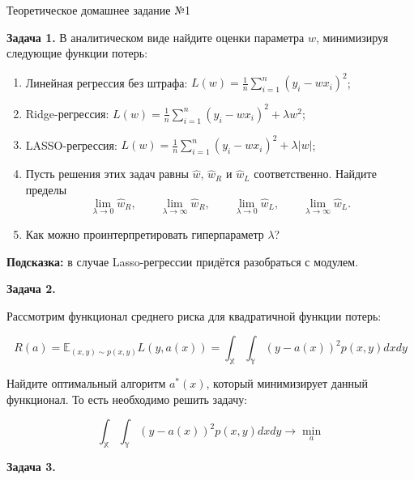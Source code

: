 \documentclass[12pt,a4paper]{article}
\begin{document}
\begin{center}
    {\Large Теоретическое домашнее задание №1}\\[8pt]
\end{center}

\vspace{2em}

\noindent
\textbf{Задача 1.} В аналитическом виде найдите оценки параметра $w$, минимизируя
следующие функции потерь:

\begin{enumerate}[itemsep=6pt, topsep=8pt]
    \item Линейная регрессия без штрафа:
          $L(w) = \frac{1}{n}\sum_{i=1}^{n}(y_i - wx_i)^2$;

    \item Ridge-регрессия:
          $L(w) = \frac{1}{n}\sum_{i=1}^{n}(y_i - wx_i)^2 + \lambda w^2$;

    \item LASSO-регрессия:
          $L(w) = \frac{1}{n}\sum_{i=1}^{n}(y_i - wx_i)^2 + \lambda|w|$;

    \item Пусть решения этих задач равны $\hat w$, $\hat w_R$ и $\hat w_L$ соответственно.
          Найдите пределы
          \[
              \lim_{\lambda \to 0} \hat w_R, \qquad
              \lim_{\lambda \to \infty} \hat w_R, \qquad
              \lim_{\lambda \to 0} \hat w_L, \qquad
              \lim_{\lambda \to \infty} \hat w_L .
          \]

    \item Как можно проинтерпретировать гиперпараметр $\lambda$?
\end{enumerate}

\textbf{Подсказка:} в случае Lasso-регрессии придётся разобраться с модулем. 

\vspace{2em}
\noindent
\textbf{Задача 2.}

Рассмотрим функционал среднего риска для квадратичной функции потерь:

\[
R(a)=\mathbb{E}_{(x, y)\sim p(x, y)}L(y, a(x))=\int_{\mathbb{X}}\int_{\mathbb{Y}}(y-a(x))^2p(x, y)dx dy
\]

Найдите оптимальный алгоритм $a^*(x)$, который минимизирует данный функционал. То есть необходимо решить задачу:

\[
\int_{\mathbb{X}}\int_{\mathbb{Y}}(y-a(x))^2p(x, y)dxdy \rightarrow \min_a
\]

\vspace{2em}
\noindent
\textbf{Задача 3.} 
\end{document}
